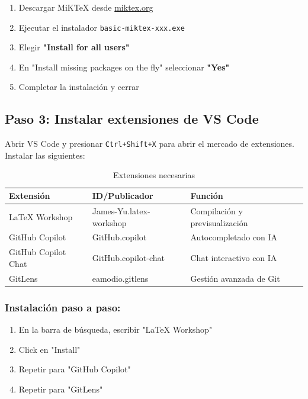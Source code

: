 \documentclass[11pt,a4paper]{article}
\newcommand{\codigo}[1]{\texttt{\textcolor{codigo}{#1}}}
\newcommand{\comando}[1]{\textcolor{azulprofundo}{\texttt{#1}}}
\begin{document}
	\begin{enumerate}
		\item Descargar MiKTeX desde \href{https://miktex.org}{miktex.org}
		\item Ejecutar el instalador \codigo{basic-miktex-xxx.exe}
		\item Elegir \textbf{"Install for all users"}
		\item En "Install missing packages on the fly" seleccionar \textbf{"Yes"}
		\item Completar la instalación y cerrar
	\end{enumerate}
	
	\subsection{Paso 3: Instalar extensiones de VS Code}
	
	Abrir VS Code y presionar \comando{Ctrl+Shift+X} para abrir el mercado de extensiones. Instalar las siguientes:
	
	\begin{table}[H]
		\centering
		\begin{tabular}{@{}lll@{}}
			\toprule
			\textbf{Extensión} & \textbf{ID/Publicador} & \textbf{Función} \\
			\midrule
			LaTeX Workshop & James-Yu.latex-workshop & Compilación y previsualización \\
			GitHub Copilot & GitHub.copilot & Autocompletado con IA \\
			GitHub Copilot Chat & GitHub.copilot-chat & Chat interactivo con IA \\
			GitLens & eamodio.gitlens & Gestión avanzada de Git \\
			\bottomrule
		\end{tabular}
		\caption{Extensiones necesarias}
		\label{tab:extensiones}
	\end{table}
	
	\subsubsection*{Instalación paso a paso:}
	\begin{enumerate}
		\item En la barra de búsqueda, escribir "LaTeX Workshop"
		\item Click en "Install"
		\item Repetir para "GitHub Copilot"
		\item Repetir para "GitLens"
	\end{enumerate}
	
\end{document}
